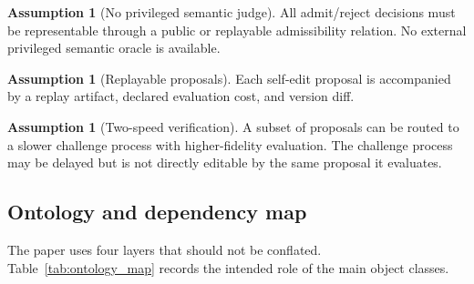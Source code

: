 \documentclass[11pt]{article}
\theoremstyle{definition}
\newtheorem{assumption}[theorem]{Assumption}
\newcommand{\1}{\mathbf{1}}
\begin{document}
\begin{assumption}[No privileged semantic judge]\label{ass:no_meta}
All admit/reject decisions must be representable through a public or replayable admissibility relation. No external privileged semantic oracle is available.
\end{assumption}

\begin{assumption}[Replayable proposals]\label{ass:replayable}
Each self-edit proposal is accompanied by a replay artifact, declared evaluation cost, and version diff.
\end{assumption}

\begin{assumption}[Two-speed verification]\label{ass:two_speed}
A subset of proposals can be routed to a slower challenge process with higher-fidelity evaluation. The challenge process may be delayed but is not directly editable by the same proposal it evaluates.
\end{assumption}

\subsection{Ontology and dependency map}
The paper uses four layers that should not be conflated. Table~\ref{tab:ontology_map} records the intended role of the main object classes.
\end{document}
